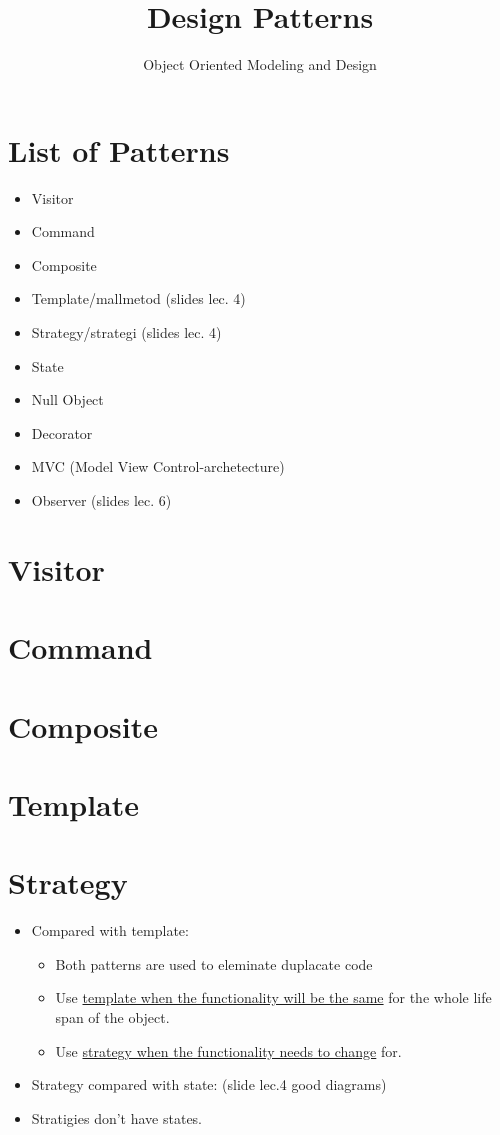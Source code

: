 \documentclass[11pt]{amsart}
\title{Design Patterns}
\author{Object Oriented Modeling and Design}
\begin{document}
\maketitle
\lstset{language=Java}

\section{List of Patterns}
\begin{itemize}
\item Visitor
\item Command
\item Composite
\item Template/mallmetod (slides lec. 4)
\item Strategy/strategi (slides lec. 4)
\item State
\item Null Object %
\item Decorator %
\item MVC (Model View Control-archetecture) %
\item Observer (slides lec. 6)
\end{itemize}

\section{Visitor}

\section{Command}

\section{Composite}

\section{Template}

\section{Strategy}
\begin{itemize}
  \item Compared with template:
  	\begin{itemize}
  	  \item Both patterns are used to eleminate duplacate code
  	  \item Use \underline{template when the functionality will be the same} for
  	  the whole life span of the object.
  	  \item Use \underline{strategy when the functionality needs to change} for.
  	\end{itemize}
  	\item Strategy compared with state: (slide lec.4 good diagrams)
	\item Stratigies don't have states.
\end{itemize}
\end{document}
